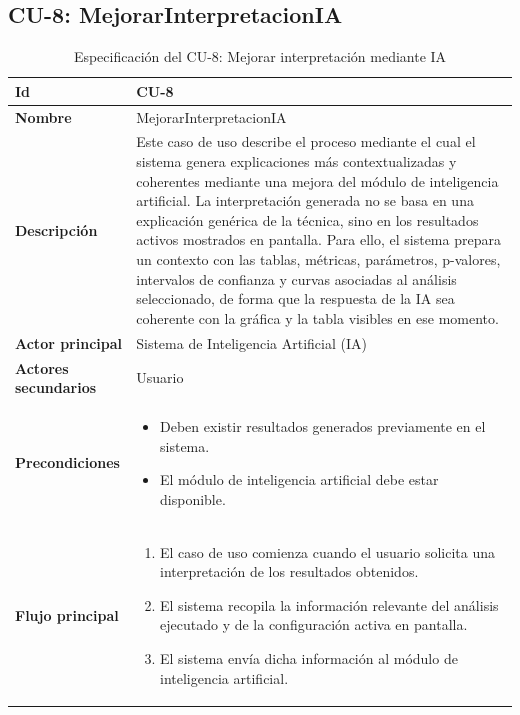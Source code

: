     \subsection{CU-8: MejorarInterpretacionIA}
\begin{longtable}{|p{4cm}|p{10cm}|}
\caption{Especificación del CU-8: Mejorar interpretación mediante IA}
\label{tab:esp_cu8}\\
\hline
\textbf{Id} & CU-8 \\ \hline
\textbf{Nombre} & MejorarInterpretacionIA \\ \hline

\textbf{Descripción} & 
Este caso de uso describe el proceso mediante el cual el sistema genera explicaciones más contextualizadas y coherentes mediante una mejora del módulo de inteligencia artificial. La interpretación generada no se basa en una explicación genérica de la técnica, sino en los resultados activos mostrados en pantalla. Para ello, el sistema prepara un contexto con las tablas, métricas, parámetros, p-valores, intervalos de confianza y curvas asociadas al análisis seleccionado, de forma que la respuesta de la IA sea coherente con la gráfica y la tabla visibles en ese momento. \\ \hline

\textbf{Actor principal} & Sistema de Inteligencia Artificial (IA) \\ \hline
\textbf{Actores secundarios} & Usuario \\ \hline

\textbf{Precondiciones} & 
\begin{itemize}
    \item Deben existir resultados generados previamente en el sistema.
    \item El módulo de inteligencia artificial debe estar disponible.
\end{itemize} \\ \hline

\textbf{Flujo principal} & 
\begin{enumerate}
    \item El caso de uso comienza cuando el usuario solicita una interpretación de los resultados obtenidos.
    
    \item El sistema recopila la información relevante del análisis ejecutado y de la configuración activa en pantalla.
    
    \item El sistema envía dicha información al módulo de inteligencia artificial.
    

\end{enumerate}
\end{longtable}
